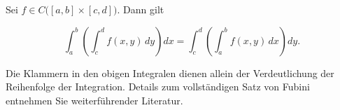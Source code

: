 \begin{satz}{}
Sei $f\in C\bigl([a,b]\times[c,d]\bigr)$. Dann gilt


$$
\int_a^b\left(\int_c^d f(x,y)\,dy\right)dx = \int_c^d\left(\int_a^b f(x,y)\,dx\right)dy.
$$


\end{satz}

\begin{bemerkungbox}
Die Klammern in den obigen Integralen dienen allein der Verdeutlichung der Reihenfolge der Integration. Details zum vollständigen Satz von Fubini entnehmen Sie weiterführender Literatur.
\end{bemerkungbox}


